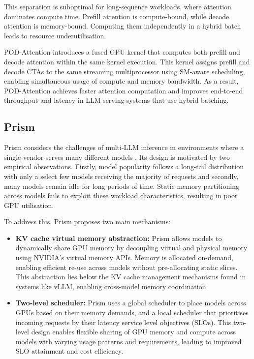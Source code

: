 \documentclass[11pt,twoside]{report}
\begin{document}
This separation is suboptimal for long-sequence workloads, where attention dominates compute time. 
Prefill attention is compute-bound, while decode attention is memory-bound. 
Computing them independently in a hybrid batch leads to resource underutilisation. 

POD-Attention introduces a fused GPU kernel that computes both prefill and decode attention within the same kernel execution. 
This kernel assigns prefill and decode CTAs to the same streaming multiprocessor using SM-aware scheduling, enabling simultaneous usage of compute and memory bandwidth. 
As a result, POD-Attention achieves faster attention computation and improves end-to-end throughput and latency in LLM serving systems that use hybrid batching.

\subsection{Prism}
Prism considers the challenges of multi-LLM inference in environments where a single vendor serves many different models \cite{kamath2025pod}. 
Its design is motivated by two empirical observations.
Firstly, model popularity follows a long-tail distribution with only a select few models receiving the majority of requests and secondly, many models remain idle for long periods of time.
Static memory partitioning across models fails to exploit these workload characteristics, resulting in poor GPU utilisation.

To address this, Prism proposes two main mechanisms:
\begin{itemize}
  \item \textbf{KV cache virtual memory abstraction:} Prism allows models to dynamically share GPU memory by decoupling virtual and physical memory using NVIDIA's virtual memory APIs. 
    Memory is allocated on-demand, enabling efficient re-use across models without pre-allocating static slices. 
    This abstraction lies below the KV cache management mechanisms found in systems like vLLM, enabling cross-model memory coordination.

  \item \textbf{Two-level scheduler:} Prism uses a global scheduler to place models across GPUs based on their memory demands, and a local scheduler that prioritises incoming requests by their latency service level objectives (SLOs). 
    This two-level design enables flexible sharing of GPU memory and compute across models with varying usage patterns and requirements, leading to improved SLO attainment and cost efficiency.
\end{itemize}
\end{document}
